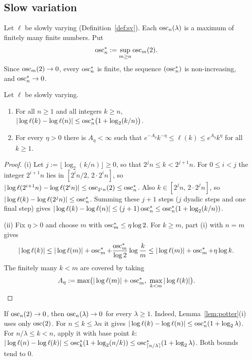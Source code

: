 \subsection{Slow variation}\label{sec:prelim-sv}

Let $\ell$ be slowly varying (Definition~\ref{def:sv}). Each $\operatorname{osc}_n(\lambda)$ is a maximum of finitely many finite numbers. Put
\[
  \operatorname{osc}^*_n:=\sup_{m\ge n}\operatorname{osc}_m(2).
\]
Since $\operatorname{osc}_m(2)\to0$, every $\operatorname{osc}^*_n$ is finite, the sequence $(\operatorname{osc}^*_n)$ is non-increasing, and
$\operatorname{osc}^*_n\to0$.

\begin{lemma}\label{lem:potter}
Let $\ell$ be slowly varying.
\begin{enumerate}
\item[\textup{(i)}] For all $n\ge1$ and all integers $k\ge n$,
  $|\log\ell(k)-\log\ell(n)|\le\operatorname{osc}^*_n\bigl(1+\log_2(k/n)\bigr)$.
\item[\textup{(ii)}] For every $\eta>0$ there is $A_\eta<\infty$ such that $e^{-A_\eta}k^{-\eta}\le\ell(k)\le e^{A_\eta}k^{\eta}$ for
  all $k\ge1$.
\end{enumerate}
\end{lemma}

\begin{proof}
(i) Let $j:=\lfloor\log_2(k/n)\rfloor\ge0$, so that $2^jn\le k<2^{j+1}n$. For $0\le i<j$ the integer $2^{i+1}n$ lies in
$[2^in/2,\,2\cdot2^in]$, so $|\log\ell(2^{i+1}n)-\log\ell(2^in)|\le\operatorname{osc}_{2^in}(2)\le\operatorname{osc}^*_n$. Also $k\in[2^jn,\,2\cdot
2^jn]$, so $|\log\ell(k)-\log\ell(2^jn)|\le\operatorname{osc}^*_n$. Summing these $j+1$ steps ($j$ dyadic steps and one final
step) gives
$|\log\ell(k)-\log\ell(n)|\le(j+1)\operatorname{osc}^*_n\le\operatorname{osc}^*_n(1+\log_2(k/n))$.

(ii) Fix $\eta>0$ and choose $m$ with $\operatorname{osc}^*_m\le\eta\log2$. For $k\ge m$, part (i) with $n=m$ gives
\[
  |\log\ell(k)|\le|\log\ell(m)|+\operatorname{osc}^*_m+\frac{\operatorname{osc}^*_m}{\log2}\log\frac km\le|\log\ell(m)|+\operatorname{osc}^*_m+\eta\log k .
\]
The finitely many $k<m$ are covered by taking
\[
  A_\eta:=\max\bigl(|\log\ell(m)|+\osc^*_m,\ \max_{k<m}|\log\ell(k)|\bigr).
\]
\end{proof}

\begin{remark}[$\lambda=2$ suffices]\label{rem:lambda2}
If $\operatorname{osc}_n(2)\to0$, then $\operatorname{osc}_n(\lambda)\to0$ for every $\lambda\ge1$. Indeed, Lemma~\ref{lem:potter}(i) uses only
$\operatorname{osc}(2)$. For $n\le k\le\lambda n$ it gives $|\log\ell(k)-\log\ell(n)|\le\operatorname{osc}^*_n(1+\log_2\lambda)$. For $n/\lambda\le
k<n$, apply it with base point $k$: $|\log\ell(n)-\log\ell(k)|\le\operatorname{osc}^*_k(1+\log_2(n/k))\le\operatorname{osc}^*_{\lceil
n/\lambda\rceil}(1+\log_2\lambda)$. Both bounds tend to $0$.
\end{remark}

